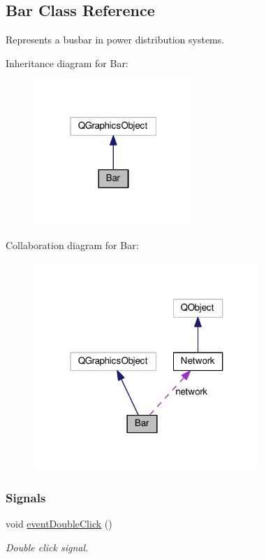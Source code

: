 \hypertarget{class_bar}{}\subsection{Bar Class Reference}
\label{class_bar}


Represents a busbar in power distribution systems.  




Inheritance diagram for Bar\+:\nopagebreak
\begin{figure}[H]
\begin{center}
\leavevmode
\includegraphics[width=172pt]{class_bar__inherit__graph}
\end{center}
\end{figure}


Collaboration diagram for Bar\+:\nopagebreak
\begin{figure}[H]
\begin{center}
\leavevmode
\includegraphics[width=244pt]{class_bar__coll__graph}
\end{center}
\end{figure}
\subsubsection*{Signals}
\begin{DoxyCompactItemize}
\item 
void \hyperlink{class_bar_a66bcbd19582dddee7e171ae5a4475f4b}{event\+Double\+Click} ()
\begin{DoxyCompactList}\small\item\em Double click signal. \end{DoxyCompactList}\end{DoxyCompactItemize}
